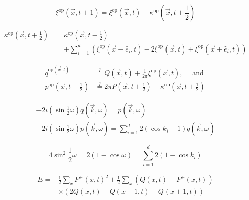 \documentclass[main.tex]{subfiles}
\begin{document}
\begin{equation}\label{17.70}
	\xi^{\mathrm{op}}(\vec{x}, t+1)=\xi^{\mathrm{op}}(\vec{x}, t)+\kappa^{\mathrm{op}}\left(\vec{x}, t+\frac{1}{2}\right)
\end{equation}


\begin{equation}\label{17.71}
	\begin{aligned} \kappa^{\mathrm{op}}\left(\vec{x}, t+\frac{1}{2}\right)=& \kappa^{\mathrm{op}}\left(\vec{x}, t-\frac{1}{2}\right) \\ &+\sum_{i=1}^{d}\left(\xi^{\mathrm{op}}\left(\vec{x}-\hat{e}_{i}, t\right)-2 \xi^{\mathrm{op}}(\vec{x}, t)+\xi^{\mathrm{op}}\left(\vec{x}+\hat{e}_{i}, t\right)\right) \end{aligned}
\end{equation}


\begin{equation}\label{17.72}
	\begin{aligned} q^{\mathrm{op}(\vec{x}, t)} & \stackrel{?}{=} Q(\vec{x}, t)+\frac{1}{2 \pi} \xi^{\mathrm{op}}(\vec{x}, t), \quad \text { and } \\ p^{\mathrm{op}}\left(\vec{x}, t+\frac{1}{2}\right) & \stackrel{?}{=} 2 \pi P\left(\vec{x}, t+\frac{1}{2}\right)+\kappa^{\mathrm{op}}\left(\vec{x}, t+\frac{1}{2}\right) \end{aligned}
\end{equation}

\begin{equation}\label{17.73}
	\begin{array}{l}{-2 i\left(\sin \frac{1}{2} \omega\right) q(\vec{k}, \omega)=p(\vec{k}, \omega)} \\ {-2 i\left(\sin \frac{1}{2} \omega\right) p(\vec{k}, \omega)=\sum_{i=1}^{d} 2\left(\cos k_{i}-1\right) q(\vec{k}, \omega)}\end{array}
\end{equation}



\begin{equation}\label{17.74}
	4 \sin ^{2} \frac{1}{2} \omega=2(1-\cos \omega)=\sum_{i=1}^{d} 2\left(1-\cos k_{i}\right)
\end{equation}



\begin{equation}\label{17.75}
	\begin{aligned} E=& \frac{1}{2} \sum_{x} P^{+}(x, t)^{2}+\frac{1}{2} \sum_{x}\left(Q(x, t)+P^{+}(x, t)\right) \\ & \times(2 Q(x, t)-Q(x-1, t)-Q(x+1, t)) \end{aligned}
\end{equation}
\end{document}
